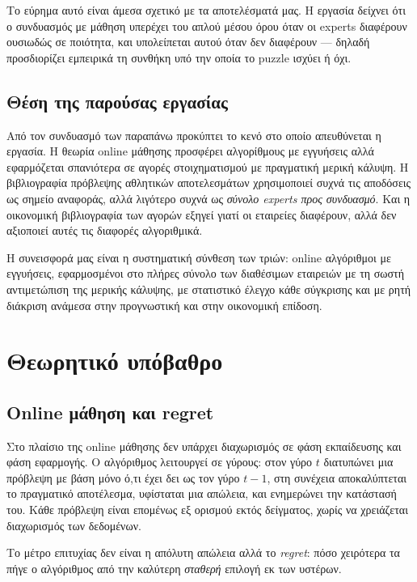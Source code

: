 \documentclass[12pt,a4paper,oneside]{report}
\renewcommand{\_}{\oldunderscore\allowbreak}
\theoremstyle{definition}
\theoremstyle{plain}
\theoremstyle{remark}
\begin{document}
Το εύρημα αυτό είναι άμεσα σχετικό με τα αποτελέσματά μας. Η εργασία δείχνει ότι ο
συνδυασμός με μάθηση υπερέχει του απλού μέσου όρου όταν οι experts διαφέρουν ουσιωδώς σε
ποιότητα, και υπολείπεται αυτού όταν δεν διαφέρουν --- δηλαδή προσδιορίζει εμπειρικά τη
συνθήκη υπό την οποία το puzzle ισχύει ή όχι.

\section{Θέση της παρούσας εργασίας}

Από τον συνδυασμό των παραπάνω προκύπτει το κενό στο οποίο απευθύνεται η εργασία. Η θεωρία
online μάθησης προσφέρει αλγορίθμους με εγγυήσεις αλλά εφαρμόζεται σπανιότερα σε αγορές
στοιχηματισμού με πραγματική μερική κάλυψη. Η βιβλιογραφία πρόβλεψης αθλητικών
αποτελεσμάτων χρησιμοποιεί συχνά τις αποδόσεις ως σημείο αναφοράς, αλλά λιγότερο συχνά ως
\emph{σύνολο experts προς συνδυασμό}. Και η οικονομική βιβλιογραφία των αγορών εξηγεί γιατί
οι εταιρείες διαφέρουν, αλλά δεν αξιοποιεί αυτές τις διαφορές αλγοριθμικά.

Η συνεισφορά μας είναι η συστηματική σύνθεση των τριών: online αλγόριθμοι με εγγυήσεις,
εφαρμοσμένοι στο πλήρες σύνολο των διαθέσιμων εταιρειών με τη σωστή αντιμετώπιση της μερικής
κάλυψης, με στατιστικό έλεγχο κάθε σύγκρισης και με ρητή διάκριση ανάμεσα στην προγνωστική
και στην οικονομική επίδοση.

\chapter{Θεωρητικό υπόβαθρο}
\label{ch:theory}

\section{Online μάθηση και regret}

Στο πλαίσιο της online μάθησης δεν υπάρχει διαχωρισμός σε φάση εκπαίδευσης και φάση
εφαρμογής. Ο αλγόριθμος λειτουργεί σε γύρους: στον γύρο $t$ διατυπώνει μια πρόβλεψη με βάση
μόνο ό,τι έχει δει ως τον γύρο $t-1$, στη συνέχεια αποκαλύπτεται το πραγματικό αποτέλεσμα,
υφίσταται μια απώλεια, και ενημερώνει την κατάστασή του. Κάθε πρόβλεψη είναι επομένως εξ
ορισμού εκτός δείγματος, χωρίς να χρειάζεται διαχωρισμός των δεδομένων.

Το μέτρο επιτυχίας δεν είναι η απόλυτη απώλεια αλλά το \emph{regret}: πόσο χειρότερα τα πήγε
ο αλγόριθμος από την καλύτερη \emph{σταθερή} επιλογή εκ των υστέρων.
\end{document}
